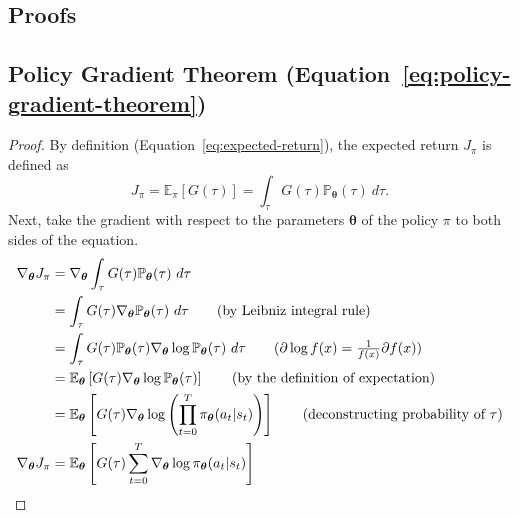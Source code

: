 \documentclass[12pt]{report}
\theoremstyle{definition}
\theoremstyle{remark}
\begin{document}
\begin{appendices}
\chapter{Proofs}
\section{Policy Gradient Theorem (Equation~\ref{eq:policy-gradient-theorem})}\label{sec:policy-gradient-theorem-proof}
\begin{proof}
    By definition (Equation~\ref{eq:expected-return}), the expected return $J_\pi$ is defined as
    \begin{equation*}
        J_\pi = \mathbb{E}_\pi[G(\tau)] = \int_{\tau} G(\tau)\mathbb{P}_{\boldsymbol{\theta}}(\tau)\ d\tau.
    \end{equation*}
    Next, take the gradient with respect to the parameters $\boldsymbol{\theta}$ of the policy $\pi$ to both sides of the equation.
    \begin{align*}
        \nabla_{\boldsymbol{\theta}} J_\pi &= \nabla_{\boldsymbol{\theta}} \int_{\tau} G(\tau)\mathbb{P}_{\boldsymbol{\theta}}(\tau)\ d\tau \\
        &= \int_{\tau} G(\tau) \nabla_{\boldsymbol{\theta}} \mathbb{P}_{\boldsymbol{\theta}}(\tau)\ d\tau \tag{by Leibniz integral rule} \\
        &= \int_{\tau} G(\tau) \mathbb{P}_{\boldsymbol{\theta}}(\tau) \nabla_{\boldsymbol{\theta}} \log \mathbb{P}_{\boldsymbol{\theta}}(\tau)\ d\tau \tag{$\partial \log f(x) = \frac{1}{f(x)}\partial f(x)$} \\
        &= \mathbb{E}_{\boldsymbol{\theta}}\left[G(\tau) \nabla_{\boldsymbol{\theta}} \log \mathbb{P}_{\boldsymbol{\theta}}(\tau)\right] \tag{by the definition of expectation} \\
        &= \mathbb{E}_{\boldsymbol{\theta}}\left[G(\tau) \nabla_{\boldsymbol{\theta}} \log \left(\prod_{t=0}^{T} \pi_{\boldsymbol{\theta}}(a_t | s_t)\right)\right] \tag{deconstructing probability of $\tau$} \\
        \nabla_{\boldsymbol{\theta}} J_\pi &= \mathbb{E}_{\boldsymbol{\theta}}\left[G(\tau) \sum_{t=0}^{T} \nabla_{\boldsymbol{\theta}} \log \pi_{\boldsymbol{\theta}}(a_t | s_t)\right]
    \end{align*}
\end{proof}
\end{appendices}


\nocite{*} %

\printglossaries

\printbibliography
{}
\end{document}
